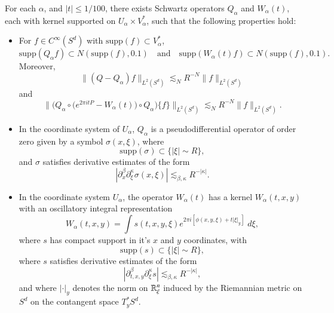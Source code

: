 \begin{lemma} \label{pseudodifferentialCoordinateLemma}
    For each $\alpha$, and $|t| \leq 1/100$, there exists Schwartz operators $Q_\alpha$ and $W_\alpha(t)$, each with kernel supported on $U_\alpha \times V^*_\alpha$, such that the following properties hold:
    \begin{itemize}
        \item For $f \in C^\infty(S^d)$ with $\text{supp}(f) \subset V^*_\alpha$,
        \[ \text{supp}(Q_\alpha f) \subset N(\text{supp}(f), 0.1) \quad\text{and}\quad \text{supp}(W_\alpha(t) f) \subset N(\text{supp}(f), 0.1). \]
        Moreover,
        \[ \| (Q - Q_\alpha) f \|_{L^2(S^d)} \lesssim_N R^{-N} \| f \|_{L^2(S^d)} \]
        and
        \[ \bigg\| \Big(Q_\alpha \circ \Big( e^{2 \pi i t P} - W_\alpha(t) \Big) \circ Q_\alpha \Big) \{ f \} \bigg\|_{L^2(S^d)} \lesssim_N R^{-N} \| f \|_{L^2(S^d)}. \]

        \item In the coordinate system of $U_\alpha$, $Q_\alpha$ is a pseudodifferential operator of order zero given by a symbol $\sigma(x,\xi)$, where
        \[ \text{supp}(\sigma) \subset \{ |\xi| \sim R \}, \]
        and $\sigma$ satisfies derivative estimates of the form
        \[ |\partial^\beta_x \partial^\kappa_\xi \sigma(x,\xi)| \lesssim_{\beta,\kappa} R^{-|\kappa|}. \]

        \item In the coordinate system $U_\alpha$, the operator $W_\alpha(t)$ has a kernel $W_\alpha(t,x,y)$ with an oscillatory integral representation
        \[ W_\alpha(t,x,y) = \int s(t,x,y,\xi) e^{2 \pi i [ \phi(x,y,\xi) + t |\xi|_y ]}\; d\xi, \]
        where $s$ has compact support in it's $x$ and $y$ coordinates, with
        \[ \text{supp}(s) \subset \{ |\xi| \sim R \}, \]
        where $s$ satisfies derivative estimates of the form
        \[ | \partial_{t,x,y}^\beta \partial_\xi^\kappa s | \lesssim_{\beta, \kappa} R^{- |\kappa|}, \]
        and where $| \cdot |_y$ denotes the norm on $\operatorname{\mathbb{R}}^n_\xi$ induced by the Riemannian metric on $S^d$ on the contangent space $T^*_y S^d$.
    \end{itemize}
\end{lemma}


